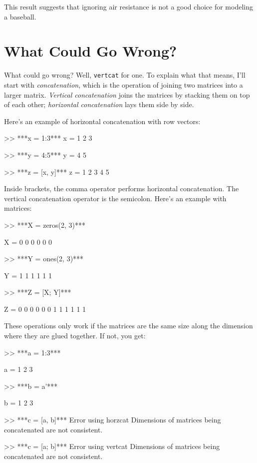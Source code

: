 \newpage
This result suggests that ignoring air resistance is not a good choice for modeling a baseball.


\section{What Could Go Wrong?}

What could go wrong?  Well, \lstinline{vertcat} for one.  To explain
what that means, I'll start with \emph{concatenation}, which is
the operation of joining two matrices into a larger matrix.
\emph{Vertical concatenation} joins the matrices by stacking them on
top of each other; \emph{horizontal concatenation} lays them
side by side.


Here's an example of horizontal concatenation with row vectors:

\begin{code}
>> ***x = 1:3***
x = 1     2     3

>> ***y = 4:5***
y = 4     5

>> ***z = [x, y]***
z = 1     2     3     4     5
\end{code}

Inside brackets, the comma operator performs horizontal concatenation.
The vertical concatenation operator is the semicolon.  Here's an
example with matrices:


\begin{code}
>> ***X = zeros(2, 3)***

X =  0     0     0
     0     0     0

>> ***Y = ones(2, 3)***

Y =  1     1     1
     1     1     1

>> ***Z = [X; Y]***

Z =  0     0     0
     0     0     0
     1     1     1
     1     1     1
\end{code}

These operations only work if the matrices are the same size along
the dimension where they are glued together.  If not, you get:

\begin{code}
>> ***a = 1:3***

a = 1     2     3

>> ***b = a'***

b =  1
     2
     3

>> ***c = [a, b]***
Error using horzcat
Dimensions of matrices being concatenated are not consistent.

>> ***c = [a; b]***
Error using vertcat
Dimensions of matrices being concatenated are not consistent.
\end{code}


